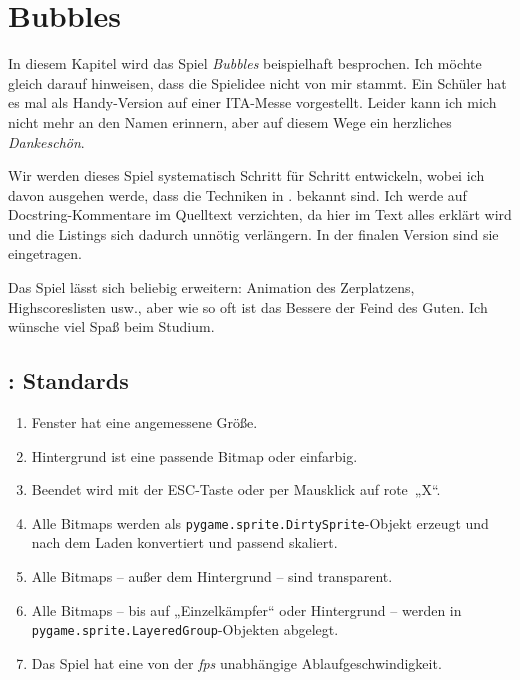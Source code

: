 \section{Bubbles}

In diesem Kapitel wird das Spiel \emph{Bubbles} beispielhaft besprochen. Ich möchte gleich darauf hinweisen, dass die Spielidee nicht von mir stammt. Ein Schüler hat es mal als Handy-Version auf einer ITA-Messe vorgestellt. Leider kann ich mich nicht mehr an den Namen erinnern, aber auf diesem Wege ein herzliches \emph{Dankeschön}. 

Wir werden dieses Spiel systematisch Schritt für Schritt entwickeln, wobei ich davon ausgehen werde, dass die Techniken in . bekannt sind. Ich werde auf Docstring-Kommentare im Quelltext verzichten, da hier im Text alles erklärt wird und die Listings sich dadurch unnötig verlängern. In der finalen Version sind sie eingetragen.

Das Spiel lässt sich beliebig erweitern: Animation des Zerplatzens, Highscoreslisten usw., aber wie so oft ist das Bessere der Feind des Guten. Ich wünsche viel Spaß beim Studium.


\subsection{: Standards}

\begin{enumerate}
    \item Fenster hat eine angemessene Größe.\label{reqStandardGröße}
    \item Hintergrund ist eine passende Bitmap oder einfarbig.\label{reqStandardHintergrund}
    \item Beendet wird mit der ESC-Taste oder per Mausklick auf rote~„X“.\label{reqStandardBeenden}
    \item Alle Bitmaps werden als \texttt{pygame.sprite.DirtySprite}-Objekt erzeugt und nach dem Laden konvertiert und passend skaliert.\label{reqStandardSprite}
    \item Alle Bitmaps -- außer dem Hintergrund -- sind transparent.\label{reqStandardTransparenz}
    \item Alle Bitmaps -- bis auf „Einzelkämpfer“ oder Hintergrund -- werden in \texttt{pygame.sprite.LayeredGroup}-Objekten abgelegt.\label{reqStandardGruppe}
    \item Das Spiel hat eine von der \emph{fps} unabhängige Ablaufgeschwindigkeit.\label{reqStandardFps}
\end{enumerate}
\er


